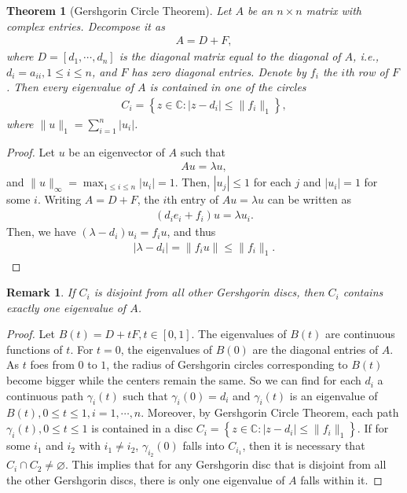 \documentclass[11pt]{book}
\newtheorem{theorem}{Theorem}[section]
\newtheorem{remark}{Remark}[section]
\theoremstyle{definition}
\numberwithin{equation}{chapter}
\begin{document}
\begin{subappendices}
\begin{theorem}[Gershgorin Circle Theorem]
Let $A$ be an $n \times n$ matrix with complex entries. Decompose it as 
\begin{align*}
    A = D + F,
\end{align*}
where $D = \left[d_1, \cdots, d_n\right]$ is the diagonal matrix equal to the diagonal of $A$, i.e., $d_i = a_{ii}, 1 \leq i \leq n$, and $F$ has zero diagonal entries. Denote by $f_i$ the $i$th row of $F$. Then every eigenvalue of $A$ is contained in one of the circles
\begin{align*}
    C_i = \left\{z \in \mathbb{C}: |z - d_i| \leq \|f_i\|_1 \right\},
\end{align*}
where $\|u\|_1 = \sum^n_{i=1} |u_i|$.
\end{theorem}
\begin{proof}
Let $u$ be an eigenvector of $A$ such that
\begin{align*}
    Au = \lambda u,
\end{align*}
and $\|u\|_\infty = \max_{1\leq i \leq n}|u_i| = 1$. Then, $|u_j| \leq 1$ for each $j$ and $|u_i| = 1$ for some $i$. Writing $A = D + F$, the $i$th entry of $Au = \lambda u$ can be written as 
\begin{align*}
    (d_i e_i + f_i)u = \lambda u_i.
\end{align*}
Then, we have $(\lambda - d_i)u_i = f_i u$, and thus
\begin{align*}
    |\lambda - d_i| = \|f_i u\| \leq \|f_i\|_1.
\end{align*}
\end{proof}

\begin{remark}
If $C_i$ is disjoint from all other Gershgorin discs, then $C_i$ contains exactly one eigenvalue of $A$.
\end{remark}
\begin{proof}
Let $B(t) = D + tF, t \in [0,1]$. The eigenvalues of $B(t)$ are continuous functions of $t$. For $t = 0$, the eigenvalues of $B(0)$ are the diagonal entries of $A$. As $t$ foes from $0$ to $1$, the radius of Gershgorin circles corresponding to $B(t)$ become bigger while the centers remain the same. So we can find for each $d_i$ a continuous path $\gamma_i(t)$ such that $\gamma_i(0) = d_i$ and $\gamma_i(t)$ is an eigenvalue of $B(t), 0 \leq t \leq 1, i = 1, \cdots, n$. Moreover, by Gershgorin Circle Theorem, each path $\gamma_i(t), 0 \leq t \leq 1$ is contained in a disc $C_i = \left\{z \in \mathbb{C}: |z - d_i| \leq \|f_i\|_1 \right\}$. If for some $i_1$ and $i_2$ with $i_1 \neq i_2$, $\gamma_{i_2}(0)$ falls into $C_{i_1}$, then it is necessary that $C_i \cap C_2 \neq \varnothing$. This implies that for any Gershgorin disc that is disjoint from all the other Gershgorin discs, there is only one eigenvalue of $A$ falls within it.
\end{proof}







\end{subappendices}
\end{document}
